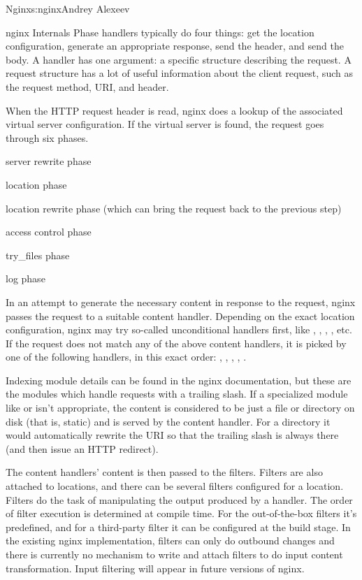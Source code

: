 \begin{aosachapter}{Nginx}{s:nginx}{Andrey Alexeev}
\begin{aosasect1}{nginx Internals}
Phase handlers typically do four things: get the location
configuration, generate an appropriate response, send the header, and
send the body. A handler has one argument: a specific structure
describing the request. A request structure has a lot of useful
information about the client request, such as the request method, URI,
and header.

When the HTTP request header is read, nginx does a lookup of the
associated virtual server configuration. If the virtual server is
found, the request goes through six phases.

\begin{aosaenumerate}

\item server rewrite phase

\item location phase

\item location rewrite phase (which can bring the request back to the
previous step)

\item access control phase

\item try\_files phase

\item log phase

\end{aosaenumerate}

In an attempt to generate the necessary content in response to the
request, nginx passes the request to a suitable content
handler. Depending on the exact location configuration, nginx may try
so-called unconditional handlers first, like ,
, , , etc. If the request does
not match any of the above content handlers, it is picked by one of
the following handlers, in this exact order: ,
, , , .

Indexing module details can be found in the nginx documentation, but
these are the modules which handle requests with a trailing slash. If
a specialized module like  or  isn't
appropriate, the content is considered to be just a file or directory
on disk (that is, static) and is served by the  content
handler. For a directory it would automatically rewrite the URI so
that the trailing slash is always there (and then issue an HTTP
redirect).

The content handlers' content is then passed to the filters. Filters
are also attached to locations, and there can be several filters
configured for a location. Filters do the task of manipulating the
output produced by a handler. The order of filter execution is
determined at compile time. For the out-of-the-box filters it's
predefined, and for a third-party filter it can be configured at the
build stage. In the existing nginx implementation, filters can only do
outbound changes and there is currently no mechanism to write and
attach filters to do input content transformation. Input filtering
will appear in future versions of nginx.


\end{aosasect1}
\end{aosachapter}
